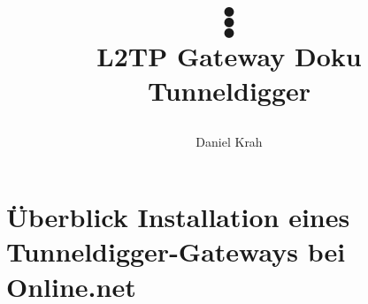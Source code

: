 \documentclass[11pt, a4paper,ngerman]{article}
\title{
\color{white}
 $\bullet$ \\ $\bullet$ \\ $\bullet$ \\
 \color{black}
 \color{black}
L2TP Gateway Doku\\
Tunneldigger
 \begin{center}
\end{center}
}
\author{Daniel Krah}
\begin{document}
\maketitle%
\newpage%
 \tableofcontents%



%
% 







% 
\newpage
\section{Überblick Installation eines Tunneldigger-Gateways bei Online.net}

% 



%  
% 
% 
% 

% 




% 
% 
% 
% 
% 
%  


% 






% 
% 
% 
% 
% 
% 
% 




%
\end{document}

